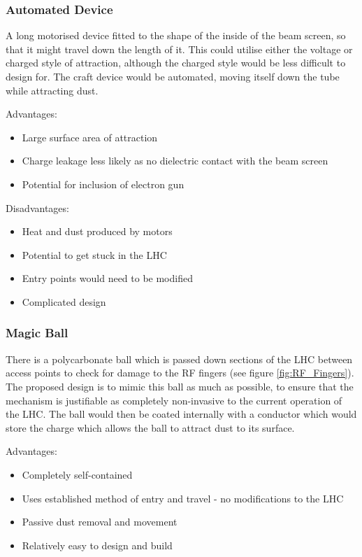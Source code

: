 \documentclass[../main.tex]{subfiles}
\begin{document}
\subsubsection{Automated Device}
A long motorised device fitted to the shape of the inside of the beam screen, so that it might travel down the length of it.
This could utilise either the voltage or charged style of attraction, although the charged style would be less difficult to design for.
The craft device would be automated, moving itself down the tube while attracting dust.

Advantages:
\begin{itemize}
	\item Large surface area of attraction
	\item Charge leakage less likely as no dielectric contact with the beam screen
	\item Potential for inclusion of electron gun
\end{itemize}

Disadvantages:
\begin{itemize}
	\item Heat and dust produced by motors
	\item Potential to get stuck in the LHC
	\item Entry points would need to be modified
	\item Complicated design
\end{itemize}

\subsubsection{Magic Ball}
There is a polycarbonate ball which is passed down sections of the LHC between access points to check for damage to the RF fingers (see figure \ref{fig:RF_Fingers}).
The proposed design is to mimic this ball as much as possible, to ensure that the mechanism is justifiable as completely non-invasive to the current operation of the LHC.
The ball would then be coated internally with a conductor which would store the charge which allows the ball to attract dust to its surface.

Advantages:
\begin{itemize}
	\item Completely self-contained
	\item Uses established method of entry and travel - no modifications to the LHC
	\item Passive dust removal and movement
	\item Relatively easy to design and build
\end{itemize}
\end{document}
